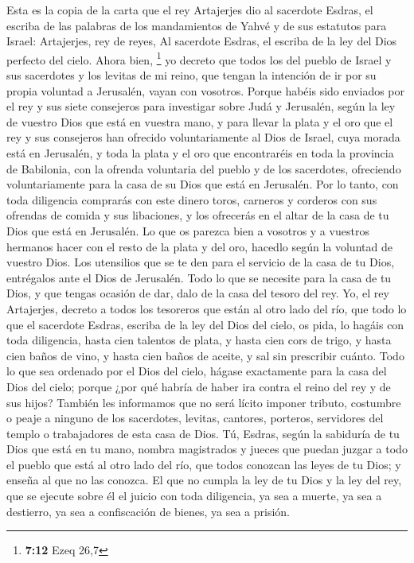 \begin{paracol}{2}
 Esta es la copia de la carta que el rey Artajerjes dio
al sacerdote Esdras, el escriba de las palabras de los mandamientos de
Yahvé y de sus estatutos para Israel:  Artajerjes, rey de
reyes, Al sacerdote Esdras, el escriba de la ley del Dios perfecto del
cielo. Ahora bien, \footnote{\textbf{7:12} Ezeq 26,7}  yo
decreto que todos los del pueblo de Israel y sus sacerdotes y los
levitas de mi reino, que tengan la intención de ir por su propia
voluntad a Jerusalén, vayan con vosotros.  Porque habéis
sido enviados por el rey y sus siete consejeros para investigar sobre
Judá y Jerusalén, según la ley de vuestro Dios que está en vuestra mano,
 y para llevar la plata y el oro que el rey y sus
consejeros han ofrecido voluntariamente al Dios de Israel, cuya morada
está en Jerusalén,  y toda la plata y el oro que
encontraréis en toda la provincia de Babilonia, con la ofrenda
voluntaria del pueblo y de los sacerdotes, ofreciendo voluntariamente
para la casa de su Dios que está en Jerusalén.  Por lo
tanto, con toda diligencia comprarás con este dinero toros, carneros y
corderos con sus ofrendas de comida y sus libaciones, y los ofrecerás en
el altar de la casa de tu Dios que está en Jerusalén.  Lo
que os parezca bien a vosotros y a vuestros hermanos hacer con el resto
de la plata y del oro, hacedlo según la voluntad de vuestro Dios.
 Los utensilios que se te den para el servicio de la casa
de tu Dios, entrégalos ante el Dios de Jerusalén.  Todo
lo que se necesite para la casa de tu Dios, y que tengas ocasión de dar,
dalo de la casa del tesoro del rey.  Yo, el rey
Artajerjes, decreto a todos los tesoreros que están al otro lado del
río, que todo lo que el sacerdote Esdras, escriba de la ley del Dios del
cielo, os pida, lo hagáis con toda diligencia,  hasta
cien talentos de plata, y hasta cien cors de trigo, y hasta cien baños
de vino, y hasta cien baños de aceite, y sal sin prescribir cuánto.
 Todo lo que sea ordenado por el Dios del cielo, hágase
exactamente para la casa del Dios del cielo; porque ¿por qué habría de
haber ira contra el reino del rey y de sus hijos? 
También les informamos que no será lícito imponer tributo, costumbre o
peaje a ninguno de los sacerdotes, levitas, cantores, porteros,
servidores del templo o trabajadores de esta casa de Dios.
 Tú, Esdras, según la sabiduría de tu Dios que está en tu
mano, nombra magistrados y jueces que puedan juzgar a todo el pueblo que
está al otro lado del río, que todos conozcan las leyes de tu Dios; y
enseña al que no las conozca.  El que no cumpla la ley de
tu Dios y la ley del rey, que se ejecute sobre él el juicio con toda
diligencia, ya sea a muerte, ya sea a destierro, ya sea a confiscación
de bienes, ya sea a prisión.


\end{paracol}
